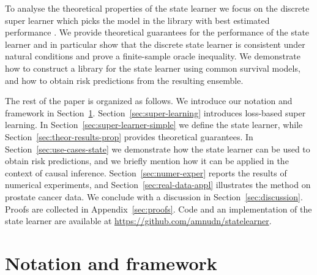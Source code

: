 \documentclass[a4paper,danish]{article}
\theoremstyle{plain} %
\numberwithin{theorem}{section}
\theoremstyle{definition} %
\theoremstyle{remark}
\newcommand{\1}{\mathds{1}}
\begin{document}
To analyse the theoretical properties of the state learner we
focus on the discrete super learner which picks the model in
the library with best estimated performance
\citep{van2007super}. We provide theoretical guarantees
for the performance of the state learner and in particular
show that the discrete state learner is consistent under
natural conditions and prove a finite-sample oracle
inequality. We demonstrate how to construct a library for the
state learner using common survival models, and how to obtain
risk predictions from the resulting ensemble.

The rest of the paper is organized as follows.
We introduce our notation and framework in
Section~\ref{sec:framework}. Section~\ref{sec:super-learning}
introduces loss-based super learning. In
Section~\ref{sec:super-learner-simple} we define the state learner,
while Section~\ref{sec:theor-results-prop} provides theoretical
guarantees. In Section~\ref{sec:use-cases-state} we demonstrate how
the state learner can be used to obtain risk predictions, and we
briefly mention how it can be applied in the context of causal
inference.  Section~\ref{sec:numer-exper} reports the results of
numerical experiments, and Section~\ref{sec:real-data-appl}
illustrates the method on prostate cancer data. We conclude with a
discussion in Section~\ref{sec:discussion}. Proofs are collected in
Appendix~\ref{sec:proofs}. Code and an implementation of the state
learner are available at \url{https://github.com/amnudn/statelearner}.

\section{Notation and framework}
\label{sec:framework}
\end{document}
